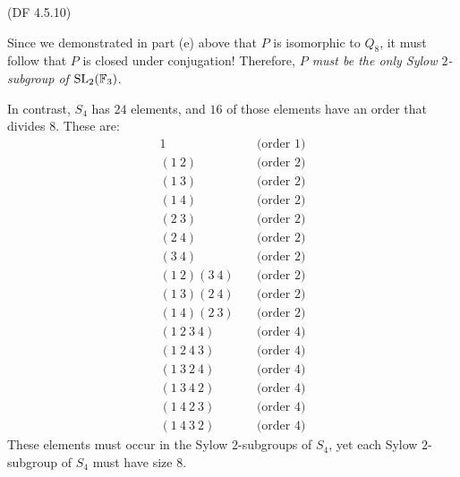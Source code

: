 \begin{problem}{(\textsf{DF 4.5.10})}
\begin{enumalph}
\begin{Answer}
        \noindent
        Since we demonstrated in part (e) above that $P$ is isomorphic to $Q_8$,
        it must follow that $P$ is closed under conjugation!
        Therefore, \emph{$P$ must be the only Sylow $2$-subgroup of $\operatorname{SL}_2(\mathbb{F}_3)$}.
        
        \bigskip
        In contrast, $S_4$ has $24$ elements, and $16$ of those elements
        have an order that divides $8$. These are:
        \begin{align*}
          1 &\quad \text{(order $1$)} \\
          (1\ 2) &\quad \text{(order $2$)} \\
          (1\ 3) &\quad \text{(order $2$)} \\
          (1\ 4) &\quad \text{(order $2$)} \\
          (2\ 3) &\quad \text{(order $2$)} \\
          (2\ 4) &\quad \text{(order $2$)} \\
          (3\ 4) &\quad \text{(order $2$)} \\
          (1\ 2)(3\ 4) &\quad \text{(order $2$)} \\
          (1\ 3)(2\ 4) &\quad \text{(order $2$)} \\
          (1\ 4)(2\ 3) &\quad \text{(order $2$)} \\
          (1\ 2\ 3\ 4) &\quad \text{(order $4$)} \\
          (1\ 2\ 4\ 3) &\quad \text{(order $4$)} \\
          (1\ 3\ 2\ 4) &\quad \text{(order $4$)} \\
          (1\ 3\ 4\ 2) &\quad \text{(order $4$)} \\
          (1\ 4\ 2\ 3) &\quad \text{(order $4$)} \\
          (1\ 4\ 3\ 2) &\quad \text{(order $4$)}
        \end{align*}
        These elements must occur in the Sylow $2$-subgroups of $S_4$,
        yet each Sylow $2$-subgroup of $S_4$ must have size $8$.
      \end{Answer}
  \end{enumalph}
\end{problem}
